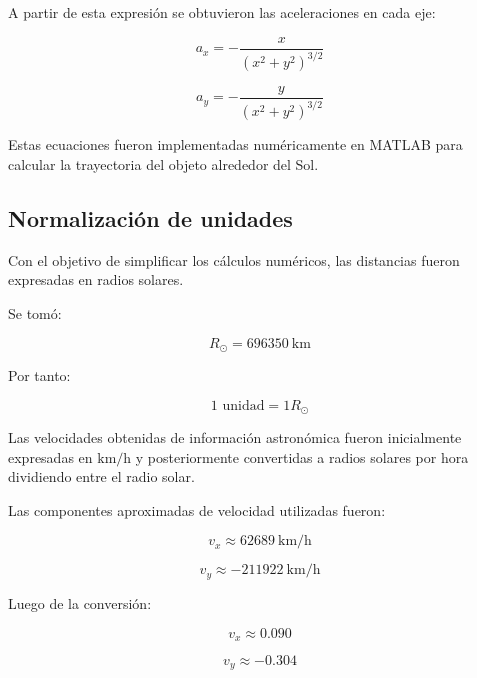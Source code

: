 A partir de esta expresión se obtuvieron las aceleraciones en cada eje:

\begin{equation}
    a_x = -\frac{x}{(x^2+y^2)^{3/2}}
\end{equation}

\begin{equation}
    a_y = -\frac{y}{(x^2+y^2)^{3/2}}
\end{equation}

Estas ecuaciones fueron implementadas numéricamente en MATLAB para calcular la trayectoria del objeto alrededor del Sol.

\subsection{Normalización de unidades}

Con el objetivo de simplificar los cálculos numéricos, las distancias fueron expresadas en radios solares.

Se tomó:

\begin{equation}
    R_{\odot} = \SI{696350}{\kilo\meter}
\end{equation}

Por tanto:

\begin{equation}
    1 \text{ unidad} = 1 R_{\odot}
\end{equation}

Las velocidades obtenidas de información astronómica fueron inicialmente expresadas en $\si{\kilo\meter/\hour}$ y posteriormente convertidas a radios solares por hora dividiendo entre el radio solar.

Las componentes aproximadas de velocidad utilizadas fueron:

\begin{equation}
    v_x \approx \SI{62689}{\kilo\meter/\hour}
\end{equation}

\begin{equation}
    v_y \approx \SI{-211922}{\kilo\meter/\hour}
\end{equation}

Luego de la conversión:

\begin{equation}
    v_x \approx 0.090
\end{equation}

\begin{equation}
    v_y \approx -0.304
\end{equation}

